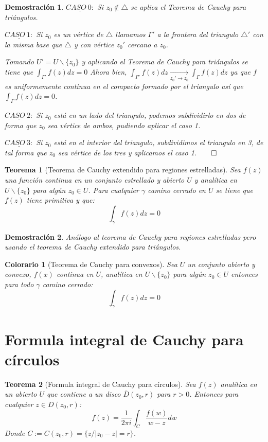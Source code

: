 \documentclass[10pt]{book}
\newtheorem{theorem}{Teorema}[chapter]
\newtheorem*{dem}{Demostración}
\newtheorem{col}{Colorario}[chapter]
\begin{document}
\begin{dem}
$\underline{CASO\ 0:}$
Si $z_0\notin \triangle$ se aplica el Teorema de Cauchy para triángulos.

$\underline{CASO\ 1:}$
Si $z_0$ es un vértice de $\triangle$ llamamos $\Gamma'$ a la frontera del triangulo $\triangle'$ con la misma base que $\triangle$ y con vértice $z_0'$ cercano a $z_0$.

Tomando $U' = U\backslash \{z_0\}$ y aplicando el Teorema de Cauchy para triángulos se tiene que $\int_{\Gamma'} f(z)dz =0$ Ahora bien, $\int_{\Gamma'} f(z)dz \xrightarrow[z_0'\to z_0]{} \int_{\Gamma} f(z)dz$ ya que $f$ es uniformemente continua en el compacto formado por el triangulo así que  $\int_{\Gamma} f(z)dz=0$.

$\underline{CASO\ 2:}$
Si $z_0$ está en un lado del triangulo, podemos subdividirlo en dos de forma que $z_0$ sea vértice de ambos, pudiendo aplicar el caso 1.

$\underline{CASO\ 3:}$
Si $z_0$ está en el interior del triangulo, subdividimos el triangulo en 3, de tal forma que $z_0$ sea vértice de los tres y aplicamos el caso 1.$\qed$
\end{dem}


\begin{theorem}[Teorema de Cauchy extendido para regiones estrelladas]
Sea $f(z)$ una función continua en un conjunto estrellado y abierto $U$ y  analítica en $U\backslash \{z_0\}$ para algún $z_0 \in U$. Para cualquier $\gamma$ camino cerrado en $U$ se tiene que $f(z)$ tiene primitiva y que:
$$
\int_{\gamma} f(z)dz = 0
$$
\end{theorem}
\begin{dem}
Análogo al teorema de Cauchy para regiones estrelladas pero usando el teorema de Cauchy extendido para triángulos.
\end{dem}


\begin{col}[Teorema de Cauchy para convexos]
Sea $U$ un conjunto abierto y convexo, $f(x)$ continua en $U$, analítica en $U\backslash \{z_0\}$ para algún $z_0 \in U$ entonces para todo $\gamma$ camino cerrado:
$$
\int_{\gamma} f(z)dz = 0
$$
\end{col}

\section{Formula integral de Cauchy para círculos}


\begin{theorem}[Formula integral de Cauchy para círculos]
Sea $f(z)$ analítica en un abierto $U$ que contiene a un disco $\overline{D}(z_0,r)$ para $r>0$. Entonces para cualquier $z \in D(z_0,r)$:
$$
f(z) = \frac{1}{2\pi i}\int_C \frac{f(w)}{w-z}dw
$$
Donde $C:= C(z_0,r) = \{z/ |z_0-z|=r\}$.
\end{theorem}
\end{document}
